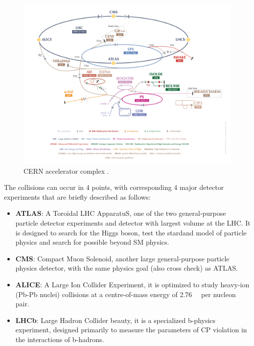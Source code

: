 \begin{figure}[!htb]
  \centering
  \includegraphics[width=1.0\textwidth]{figures/Detector/LHC_v2017.png}
  \caption{CERN accelerator complex \cite{Mobs:2197559}.}
  \label{cern_layout}
\end{figure}

The collisions can occur in 4 points, with corresponding 4 major detector experiments that are briefly described as follows:
\begin{itemize}
	\item \textbf{ATLAS}: A Toroidal LHC ApparatuS, one of the two general-purpose particle detector experiments and detector with largest volume at the LHC. It is designed to search for the Higgs boson, test the stardand model of particle physics and search for possible beyond SM physics.
	\item \textbf{CMS}: Compact Muon Solenoid, another large general-purpose particle physics detector, with the same physics goal (also cross check) as ATLAS.
	\item \textbf{ALICE}: A Large Ion Collider Experiment, it is optimized to study heavy-ion (Pb-Pb nuclei) collisions at a centre-of-mass energy of 2.76~\tev~ per nucleon pair.
	\item \textbf{LHCb}: Large Hadron Collider beauty, it is a specialized b-physics experiment, designed primarily to measure the parameters of CP violation in the interactions of b-hadrons.
\end{itemize}


